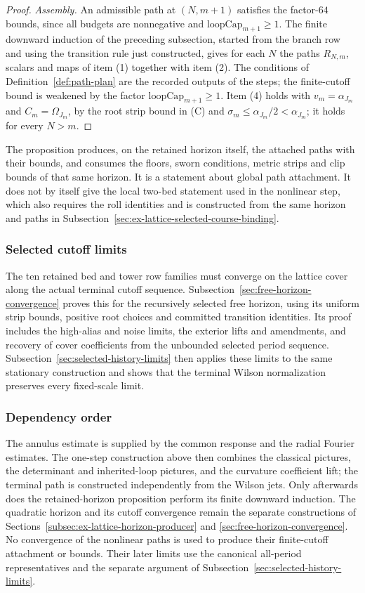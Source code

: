 \begin{proof}
\emph{Assembly.} An admissible path at $(N,m+1)$ satisfies the
factor-$64$ bounds, since all budgets are nonnegative and
$\mathrm{loopCap}_{m+1}\ge1$. The finite downward induction of the
preceding subsection, started from the branch row and using the
transition rule just constructed, gives for each $N$ the paths
$R_{N,m}$, scalars and maps of item (1) together with item (2). The
conditions of Definition~\ref{def:path-plan} are the recorded outputs
of the steps; the finite-cutoff bound is weakened by the factor
$\mathrm{loopCap}_{m+1}\ge1$. Item (4) holds with $v_m=\alpha_{J_m}$
and $C_m=\Omega_{J_m}$, by the root strip bound in \textup{(C)} and
$\sigma_m\le\alpha_{J_m}/2<\alpha_{J_m}$; it holds for every $N>m$.
\end{proof}

The proposition produces, on the retained horizon itself, the attached
paths with their bounds, and consumes the floors, sworn conditions,
metric strips and clip bounds of that same horizon. It is a statement
about global path attachment. It does not by itself give the local
two-bed statement used in the nonlinear step, which also requires the
roll identities and is constructed from the same horizon and paths in
Subsection~\ref{sec:ex-lattice-selected-course-binding}.

\subsubsection{Selected cutoff limits}
The ten retained bed and tower row families must converge on the lattice
cover along the actual terminal cutoff sequence. Subsection~\ref{sec:free-horizon-convergence}
proves this for the recursively selected free horizon, using its uniform
strip bounds, positive root choices and committed transition identities.
Its proof includes the high-alias and noise limits, the exterior lifts and
amendments, and recovery of cover coefficients from the unbounded selected
period sequence. Subsection~\ref{sec:selected-history-limits} then applies
these limits to the same stationary construction and shows that the
terminal Wilson normalization preserves every fixed-scale limit.

\subsubsection{Dependency order}

The annulus estimate is supplied by the common response and the radial
Fourier estimates. The one-step construction above then combines the
classical pictures, the determinant and inherited-loop pictures, and the
curvature coefficient lift; the terminal path is constructed independently
from the Wilson jets. Only afterwards does the retained-horizon proposition
perform its finite downward induction. The quadratic horizon and its
cutoff convergence remain the separate constructions of
Sections~\ref{subsec:ex-lattice-horizon-producer} and
\ref{sec:free-horizon-convergence}. No convergence of the nonlinear paths
is used to produce their finite-cutoff attachment or bounds. Their later
limits use the canonical all-period representatives and the separate
argument of Subsection~\ref{sec:selected-history-limits}.
